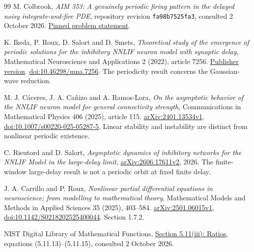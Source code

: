\documentclass[11pt,a4paper]{article}
\numberwithin{equation}{section}
\theoremstyle{remark}\newtheorem{remark}[theorem]{Remark}
\begin{document}
\begin{thebibliography}{99}
 M. Colbrook, \emph{AIM 353: A genuinely periodic firing pattern in the delayed noisy integrate-and-fire PDE}, repository revision \texttt{fa98b7525fa3}, consulted 2 October 2026. \href{https://github.com/MColbrook/AIM/blob/fa98b7525fa3f78317536a8825f9cfa0ae1c369c/problems/353-delayed-nnlif-periodic.md}{Pinned problem statement}.

 K. Ikeda, P. Roux, D. Salort and D. Smets, \emph{Theoretical study of the emergence of periodic solutions for the inhibitory NNLIF neuron model with synaptic delay}, Mathematical Neuroscience and Applications 2 (2022), article 7256. \href{https://mna.episciences.org/10212}{Publisher version}. \href{https://doi.org/10.46298/mna.7256}{doi:10.46298/mna.7256}. The periodicity result concerns the Gaussian-wave reduction.

 M. J. C\'aceres, J. A. Ca\~nizo and A. Ramos-Lora, \emph{On the asymptotic behavior of the NNLIF neuron model for general connectivity strength}, Communications in Mathematical Physics 406 (2025), article 115. \href{https://arxiv.org/html/2401.13534v1}{arXiv:2401.13534v1}. \href{https://doi.org/10.1007/s00220-025-05287-5}{doi:10.1007/s00220-025-05287-5}. Linear stability and instability are distinct from nonlinear periodic existence.

 C. Rieutord and D. Salort, \emph{Asymptotic dynamics of inhibitory networks for the NNLIF Model in the large-delay limit}, \href{https://arxiv.org/html/2606.17611v2}{arXiv:2606.17611v2}, 2026. The finite-window large-delay result is not a periodic orbit at fixed finite delay.

 J. A. Carrillo and P. Roux, \emph{Nonlinear partial differential equations in neuroscience: from modelling to mathematical theory}, Mathematical Models and Methods in Applied Sciences 35 (2025), 403--584. \href{https://arxiv.org/html/2501.06015v1}{arXiv:2501.06015v1}, \href{https://doi.org/10.1142/S0218202525400044}{doi:10.1142/S0218202525400044}. Section 1.7.2.

 NIST Digital Library of Mathematical Functions, \href{https://dlmf.nist.gov/5.11.iii}{Section 5.11(iii): Ratios}, equations (5.11.13)--(5.11.15), consulted 2 October 2026.
\end{thebibliography}
\end{document}
